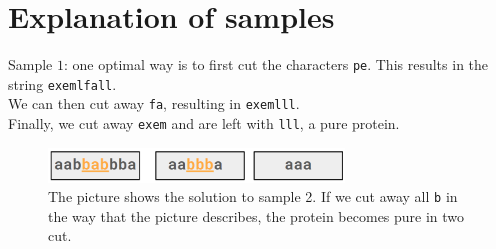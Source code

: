 \section*{Explanation of samples}

Sample $1$: one optimal way is to first cut the characters \texttt{pe}.
This results in the string \texttt{exemlfall}. \\
We can then cut away \texttt{fa}, resulting in \texttt{exemlll}. \\
Finally, we cut away \texttt{exem} and are left with \texttt{lll}, a pure protein. 



\begin{figure}[h]
  \centering
  \includegraphics[width=0.7\textwidth]{sample2.PNG}
    \\The picture shows the solution to sample 2. If we cut away all \texttt{b}
    in the way that the picture describes, the protein becomes pure in two cut.
  
\end{figure}
